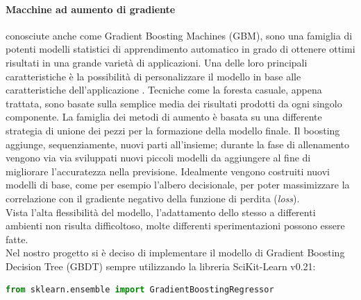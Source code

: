 \documentclass[%
    corpo=12pt,
    twoside,
    oldstyle,
    autoretitolo,
    greek,
    evenboxes,
]{toptesi}
\begin{document}
\paragraph{Macchine ad aumento di gradiente}
conosciute anche come Gradient Boosting Machines (GBM), sono una famiglia di potenti modelli statistici di apprendimento automatico in grado di ottenere ottimi risultati in una grande varietà di applicazioni. Una delle loro principali caratteristiche è la possibilità di personalizzare il modello in base alle caratteristiche dell'applicazione \cite{gbm}. Tecniche come la foresta casuale, appena trattata, sono basate sulla semplice media dei risultati prodotti da ogni singolo componente. La famiglia dei metodi di aumento è basata su una differente strategia di unione dei pezzi per la formazione della modello finale. Il boosting aggiunge, sequenziamente, nuovi parti all'insieme; durante la fase di allenamento vengono via via sviluppati nuovi piccoli modelli da aggiungere al fine di migliorare l'accuratezza nella previsione. Idealmente vengono costruiti nuovi modelli di base, come per esempio l'albero decisionale, per poter massimizzare la correlazione con il gradiente negativo della funzione di perdita (\textit{loss}).\\
Vista l'alta flessibilità del modello, l'adattamento dello stesso a differenti ambienti non risulta difficoltoso, molte differenti sperimentazioni possono essere fatte.\\
Nel nostro progetto si è deciso di implementare il modello di Gradient Boosting Decision Tree (GBDT) sempre utilizzando la libreria SciKit-Learn v0.21:
\begin{lstlisting}[language=Python, frame=single]
  from sklearn.ensemble import GradientBoostingRegressor
\end{lstlisting}
\end{document}
